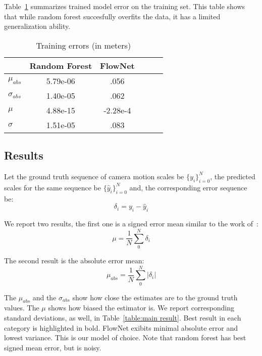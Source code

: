 Table~\ref{table:train result} summarizes trained model error on the
training set.  This table shows that while random forest succesfully
overfits the data, it has a limited generalization ability.

\begin{table}[ht]
  \centering
  \begin{tabular}{ lccccc }
    \hline
                       & Random Forest  & FlowNet       \\
    \hline
    $\mu_{abs}$        & 5.79e-06       & .056          \\
    $\sigma_{abs}$     & 1.40e-05       & .062          \\
    $\mu$              & 4.88e-15       & -2.28e-4      \\
    $\sigma$           & 1.51e-05       & .083          \\
    \hline
  \end{tabular}
  \caption{Training errors (in meters)}
  \label{table:train result}
\end{table}

\subsection{Results}\label{sec:results}

Let the ground truth sequence of camera motion scales be
$\{y_i\}_{i=0}^N$, the predicted scales for the same sequence be
$\{\hat{y}_i\}_{i=0}^N$ and, the corresponding error sequence be:
\begin{equation}
  \delta_i = y_i-\hat{y}_i
\end{equation}

We report two results, the first one is a signed error mean similar to
the work of~\cite{frost2017using}:
\begin{equation}
  \mu = \frac{1}{N}\sum_0^N{\delta_i}
\end{equation}

The second result is the absolute error mean:
\begin{equation}
  \mu_{abs} = \frac{1}{N}\sum_0^N{|\delta_i|}
\end{equation}

The $\mu_{abs}$ and the $\sigma_{abs}$ show how close the estimates
are to the ground truth values.  The $\mu$ shows how biased the
estimator is.  We report corresponding standard deviations, as well,
in Table~\ref{table:main result}.  Best result in each category is
highlighted in bold.  FlowNet exibits minimal absolute error and
lowest variance.  This is our model of choice.  Note that random
forest has best signed mean error, but is noisy.

